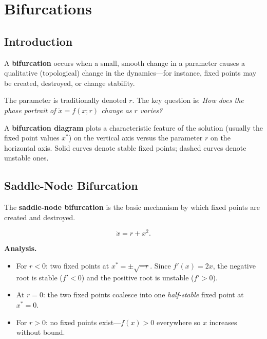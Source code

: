 \documentclass[11pt,letterpaper]{article}
\theoremstyle{definition}
\theoremstyle{plain}
\theoremstyle{remark}
\newcommand{\xdot}{\dot{x}}
\newcommand{\xstar}{x^*}
\begin{document}
\section{Bifurcations}\label{sec:bifurcations}

\subsection{Introduction}

A \textbf{bifurcation} occurs when a small, smooth change in a parameter
causes a qualitative (topological) change in the dynamics---for instance,
fixed points may be created, destroyed, or change stability.

The parameter is traditionally denoted $r$.  The key question is:
\emph{How does the phase portrait of $\xdot = f(x;r)$ change as $r$ varies?}

A \textbf{bifurcation diagram} plots a characteristic feature of the
solution (usually the fixed point values $\xstar$) on the vertical axis
versus the parameter $r$ on the horizontal axis.  Solid curves denote
stable fixed points; dashed curves denote unstable ones.

\subsection{Saddle-Node Bifurcation}\label{sec:saddle-node}

The \textbf{saddle-node bifurcation} is the basic mechanism by which fixed
points are created and destroyed.

\begin{keyresult}
\begin{equation}\label{eq:sn-normal}
  \xdot = r + x^2.
\end{equation}
\end{keyresult}

\noindent\textbf{Analysis.}
\begin{itemize}[leftmargin=2em]
\item For $r<0$: two fixed points at $\xstar = \pm\sqrt{-r}$.
      Since $f'(x)=2x$, the negative root is stable ($f'<0$) and the
      positive root is unstable ($f'>0$).
\item At $r=0$: the two fixed points coalesce into one \emph{half-stable}
      fixed point at $\xstar=0$.
\item For $r>0$: no fixed points exist---$f(x)>0$ everywhere so $x$
      increases without bound.
\end{itemize}
\end{document}
